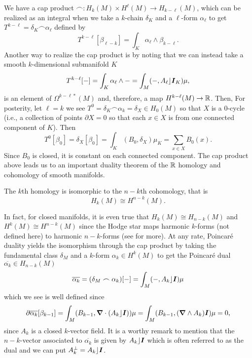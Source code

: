 \documentclass[conf]{new-aiaa}
\begin{document}
We have a cap product $\frown \colon H_k(M)\times H^\ell(M) \to H_{k-\ell}(M)$, which can be realized as an integral when we take a $k$-chain $\delta_K$ and a $\ell$-form $\alpha_\ell$ to get $T^{k-\ell} = \delta_K \frown  \alpha_\ell$ defined by
\begin{equation}
T^{k-\ell}[\beta_{\ell - k}] = \int_{K} \alpha_\ell \wedge \beta_{k-\ell}.
\end{equation}
Another way to realize the cap product is by noting that we can instead take a smooth $k$-dimensional submanifold $K$
\begin{equation}
T^{k-\ell}[-] = \int_K \alpha_\ell \wedge - = \int_M (-,A_\ell \rfloor \boldsymbol{I}_K) \mu,
\end{equation}
is an element of $\Omega^{k-\ell*}(M)$ and, therefore, a map $H^{k-\ell}(M)\to \mathbb{R}$. Then, For posterity, let $\ell = k$ we see $T^0 = \delta_K \frown \alpha_k = \delta_{X} \in H_0(M)$ so that $X$ is a $0$-cycle (i.e., a collection of points $\partial X = 0$ so that each $x\in X$ is from one connected component of $K$). Then
\begin{equation}
T^0[\beta_0] = \delta_{X}[\beta_0] = \int_{K} (B_0 , \delta_X ) \mu_{K} = \sum_{x\in X} B_0(x).
\end{equation}
Since $B_0$ is closed, it is constant on each connected component. The cap product above leads us to an important duality theorem of the $\mathbb{R}$ homology and cohomology of smooth manifolds.
\begin{theorem}
    The $k$th homology is isomorphic to the $n-k$th cohomology, that is 
\begin{equation}
H_k(M) \cong H^{n-k}(M).
\end{equation}
\end{theorem}
In fact, for closed manifolds, it is even true that $H_k(M)\cong H_{n-k}(M)$ and $H^k(M)\cong H^{n-k}(M)$ since the Hodge star maps harmonic $k$-forms (not defined here) to harmonic $n-k$-forms (see \cite{cappell_cohomology_2006} for more). At any rate, Poincar\'e duality yields the isomorphism through the cap product by taking the fundamental class $\delta_M$ and a $k$-form $\alpha_k \in H^k(M)$ to get the Poincar\'e dual $\overline{\alpha_k} \in H_{n-k}(M)$
\begin{equation}
\overline{\alpha_k} = (\delta_M \frown \alpha_k)[-] = \int_M (-,A_k \rfloor \boldsymbol{I})\mu
\end{equation}
which we see is well defined since
\begin{align}
\partial \overline{\alpha_k}[\beta_{k-1}] = \int_M (B_{k-1}, \boldsymbol{\nabla} \cdot (A_k \rfloor \boldsymbol{I}))\mu = \int_M (B_{k-1},(\boldsymbol{\nabla} \wedge A_k)\boldsymbol{I}) \mu =0,
\end{align}
since $A_k$ is a closed $k$-vector field. It is a worthy remark to mention that the $n-k$-vector associated to $\overline{\alpha_k}$ is given by $A_k \rfloor \boldsymbol{I}$ which is often referred to as the dual and we can put $A_k^\perp = A_k \rfloor \boldsymbol{I}$.
\end{document}
